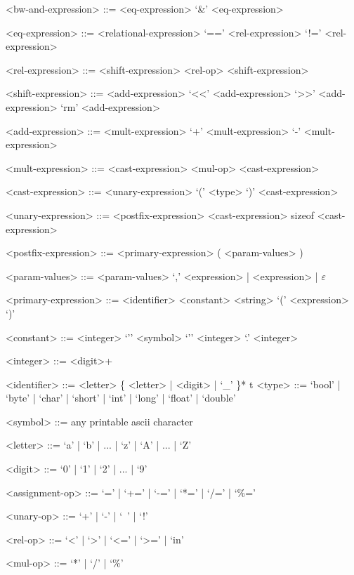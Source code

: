 \documentclass[
	article,			%
	11pt,				%
	oneside,			%
	a4paper,			%
	english,			%
	brazil,				%
	sumario=tradicional
	]{abntex2}
\begin{document}
\begin{grammar}
	<bw-and-expression> ::= <eq-expression>
	\alt <bw-and-expression> `&' <eq-expression>
	
	<eq-expression> ::= <relational-expression>
	\alt <eq-expression> `==' <rel-expression>
	\alt <eq-expression> `!=' <rel-expression>
	
	<rel-expression> ::= <shift-expression>
	\alt <rel-expression> <rel-op> <shift-expression>
	
	<shift-expression> ::= <add-expression>
	\alt <shift-expression> `<<' <add-expression>
	\alt <shift-expression> `>>' <add-expression>
	\alt <shift-expression> `rm' <add-expression>
	
	<add-expression> ::= <mult-expression>
	\alt <add-expression> `+' <mult-expression>
	\alt <add-expression> `-' <mult-expression>
	
	<mult-expression> ::= <cast-expression>
	\alt <mult-expression> <mul-op> <cast-expression>
	
	<cast-expression> ::= <unary-expression>
	\alt `(' <type> `)' <cast-expression>
	
	<unary-expression> ::= <postfix-expression>
	\alt <unary-op> <cast-expression>
	\alt sizeof <cast-expression>
	
	<postfix-expression> ::= <primary-expression>
	\alt <postfix-expression> ( <param-values> )
		
	<param-values> ::= <param-values> `,' <expression> | <expression> | $\varepsilon$
	
	<primary-expression> ::= <identifier>
	\alt <constant>
	\alt <string>
	\alt `(' <expression> `)'
	
	<constant> ::= <integer>
	\alt `'' <symbol> `''
	\alt <integer> `.' <integer>
	
	<integer> ::= <digit>+
	
	<identifier> ::= <letter> \{ <letter> | <digit> | `_' \}*
	t
	<type> ::= `bool' | `byte' | `char' | `short' | `int' | `long' | `float' | `double'
	
	<symbol> ::= any printable ascii character

	<letter> ::= `a' | `b' | ... | `z' | `A' | ... | `Z'
	
	<digit> ::= `0' | `1' | `2' | ... | `9'
	
	<assignment-op> ::= `=' | `+=' | `-=' | `*=' | `/=' | `\%='
	
	<unary-op> ::= `+' | `-' | `~' | `!'
	
	<rel-op> ::= `<' | `>' | `<=' | `>=' | `in'
	
	<mul-op> ::= `*' | `/' | `\%'
	
\end{grammar}
\end{document}
